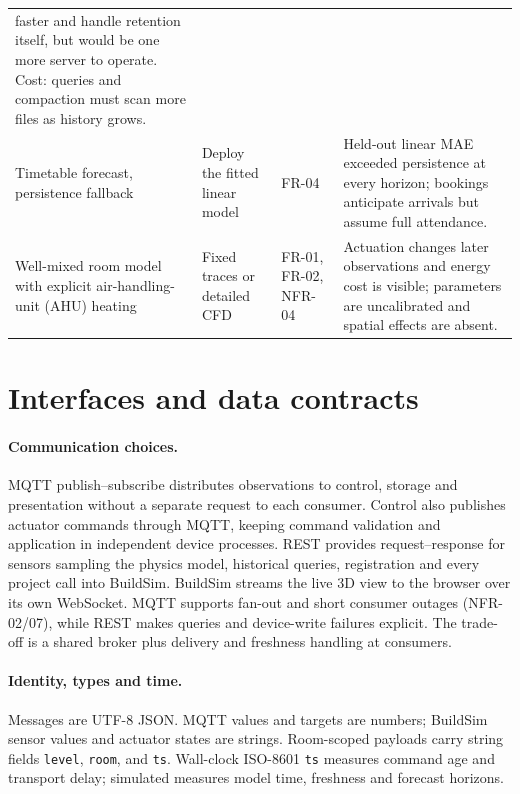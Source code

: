 \documentclass[11pt,a4paper]{article}
\begin{document}
{\begin{longtable}{>{\raggedright\arraybackslash}p{31mm}>{\raggedright\arraybackslash}p{29mm}>{\raggedright\arraybackslash}p{20mm}>{\raggedright\arraybackslash}p{56mm}}
faster and handle retention itself, but would be one more server to operate. Cost: queries and
compaction must scan more files as history grows.\\
Timetable forecast, persistence fallback & Deploy the fitted linear model &
FR-04 &
Held-out linear MAE exceeded persistence at every horizon; bookings anticipate arrivals but
assume full attendance.\\
Well-mixed room model with explicit air-handling-unit (AHU) heating & Fixed traces or detailed CFD &
FR-01, FR-02, NFR-04 &
Actuation changes later observations and energy cost is visible; parameters are uncalibrated
and spatial effects are absent.\\\bottomrule
\end{longtable}}

\section{Interfaces and data contracts}
\paragraph{Communication choices.}
MQTT publish--subscribe distributes observations to control, storage and presentation without a separate request to each consumer. Control also publishes actuator commands through MQTT, keeping command validation and application in independent device processes. REST provides request--response for sensors sampling the physics model, historical queries, registration and every project call into BuildSim. BuildSim streams the live 3D view to the browser over its own WebSocket. MQTT supports fan-out and short consumer outages (NFR-02/07), while REST makes queries and device-write failures explicit. The trade-off is a shared broker plus delivery and freshness handling at consumers.

\paragraph{Identity, types and time.}
Messages are UTF-8 JSON. MQTT values and targets are numbers; BuildSim sensor values and actuator states are strings. Room-scoped payloads carry string fields \texttt{level}, \texttt{room}, \protect{} and \texttt{ts}. Wall-clock ISO-8601 \texttt{ts} measures command age and transport delay; simulated \protect{} measures model time, freshness and forecast horizons.
\end{document}
